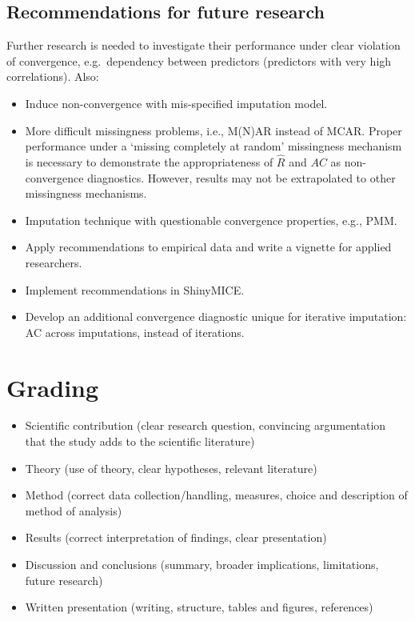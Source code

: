 \documentclass[Royal,times,sageh]{sagej}
\begin{document}
\hypertarget{recommendations-for-future-research}{%
\subsection{Recommendations for future
research}\label{recommendations-for-future-research}}

Further research is needed to investigate their performance under clear
violation of convergence, e.g.~dependency between predictors (predictors
with very high correlations). Also:

\begin{itemize}
\item
  Induce non-convergence with mis-specified imputation model.
\item
  More difficult missingness problems, i.e., M(N)AR instead of MCAR.
  Proper performance under a `missing completely at random' missingness
  mechanism is necessary to demonstrate the appropriateness of
  \(\widehat{R}\) and \(AC\) as non-convergence diagnostics. However,
  results may not be extrapolated to other missingness mechanisms.
\item
  Imputation technique with questionable convergence properties, e.g.,
  PMM.
\item
  Apply recommendations to empirical data and write a vignette for
  applied researchers.
\item
  Implement recommendations in ShinyMICE.
\item
  Develop an additional convergence diagnostic unique for iterative
  imputation: AC across imputations, instead of iterations.
\end{itemize}

\hypertarget{grading}{%
\section{Grading}\label{grading}}

\begin{itemize}
\item
  Scientific contribution (clear research question, convincing
  argumentation that the study adds to the scientific literature)
\item
  Theory (use of theory, clear hypotheses, relevant literature)
\item
  Method (correct data collection/handling, measures, choice and
  description of method of analysis)
\item
  Results (correct interpretation of findings, clear presentation)
\item
  Discussion and conclusions (summary, broader implications,
  limitations, future research)
\item
  Written presentation (writing, structure, tables and figures,
  references)
\end{itemize}



\end{document}
